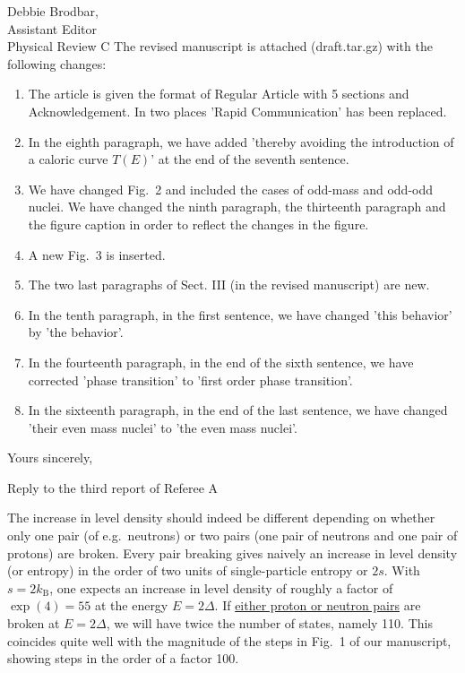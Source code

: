 \documentclass{letter}
\begin{document}
\begin{letter}{Debbie Brodbar,\\
Assistant Editor\\                               
Physical Review C}
The revised manuscript is attached (draft.tar.gz) with the following changes:

\begin{enumerate}
\item The article is given the format of Regular Article with 5 sections and Acknowledgement. In two places 'Rapid Communication' has been replaced.
\item In the eighth paragraph, we have added 'thereby avoiding the introduction
of a caloric curve $T(E)$' at the end of the seventh sentence.
\item We have changed Fig.\ 2 and included the cases of odd-mass and odd-odd
nuclei. We have changed the ninth paragraph, the thirteenth paragraph and the
figure caption in order to reflect the changes in the figure.
\item A new Fig.\ 3 is inserted.
\item The two last paragraphs of Sect. III (in the revised manuscript) are new.
\item In the tenth paragraph, in the first sentence, we have changed 'this 
behavior' by 'the behavior'.
\item In the fourteenth paragraph, in the end of the sixth sentence, we have 
corrected 'phase transition' to 'first order phase transition'.
\item In the sixteenth paragraph, in the end of the last sentence, we have 
changed 'their even mass nuclei' to 'the even mass nuclei'.

\end{enumerate}

\closing{Yours sincerely,}

\end{letter}

\clearpage

\large Reply to the third report of Referee A\normalsize

The increase in level density should indeed be different depending on whether
only one pair (of e.g.\ neutrons) or two pairs (one pair of neutrons and one 
pair of protons) are broken. Every pair breaking gives naively an increase in 
level density (or entropy) in the order of two units of single-particle entropy
or $2s$. With $s=2k_{\mathrm{B}}$, one expects an increase in level density of
roughly a factor of $\exp(4)=55$ at the energy $E=2\Delta$. If \underline{either proton or neutron pairs} are broken at $E=2\Delta$, we will have twice the number of states, namely 110. This coincides quite well with the magnitude of the steps in Fig.\ 1 of our manuscript, showing steps in the order of a factor 100.
\end{document}
